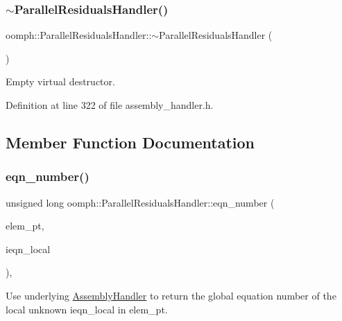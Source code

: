 \subsubsection{\texorpdfstring{$\sim$\+Parallel\+Residuals\+Handler()}{~ParallelResidualsHandler()}}
{\footnotesize\ttfamily oomph\+::\+Parallel\+Residuals\+Handler\+::$\sim$\+Parallel\+Residuals\+Handler (\begin{DoxyParamCaption}{ }\end{DoxyParamCaption})\hspace{0.3cm}{\ttfamily [inline]}}



Empty virtual destructor. 



Definition at line 322 of file assembly\+\_\+handler.\+h.



\subsection{Member Function Documentation}
\mbox{\label{classoomph_1_1ParallelResidualsHandler_a0541d552e54eb2ca8681054180eafb87}} 
\subsubsection{\texorpdfstring{eqn\+\_\+number()}{eqn\_number()}}
{\footnotesize\ttfamily unsigned long oomph\+::\+Parallel\+Residuals\+Handler\+::eqn\+\_\+number (\begin{DoxyParamCaption}\item[{\hyperlink{classoomph_1_1GeneralisedElement}{Generalised\+Element} $\ast$const \&}]{elem\+\_\+pt,  }\item[{const unsigned \&}]{ieqn\+\_\+local }\end{DoxyParamCaption})\hspace{0.3cm}{\ttfamily [inline]}, {\ttfamily [virtual]}}



Use underlying \hyperlink{classoomph_1_1AssemblyHandler}{Assembly\+Handler} to return the global equation number of the local unknown ieqn\+\_\+local in elem\+\_\+pt. 



